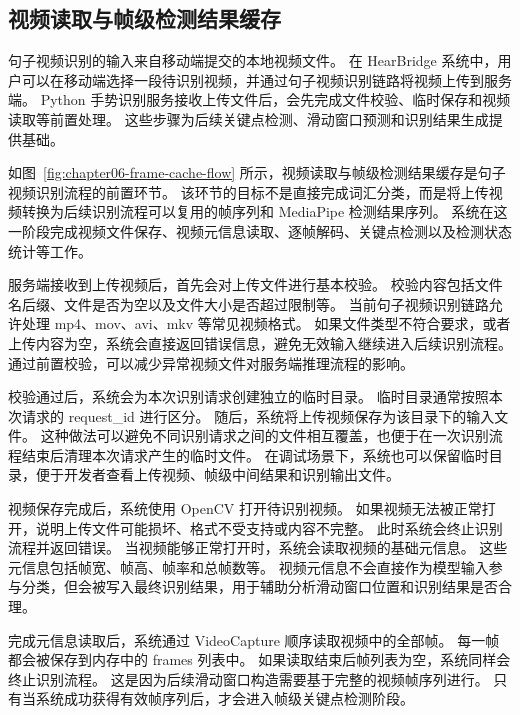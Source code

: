 
\subsection{视频读取与帧级检测结果缓存}

句子视频识别的输入来自移动端提交的本地视频文件。
在 HearBridge 系统中，用户可以在移动端选择一段待识别视频，并通过句子视频识别链路将视频上传到服务端。
Python 手势识别服务接收上传文件后，会先完成文件校验、临时保存和视频读取等前置处理。
这些步骤为后续关键点检测、滑动窗口预测和识别结果生成提供基础。


如图~\ref{fig:chapter06-frame-cache-flow} 所示，视频读取与帧级检测结果缓存是句子视频识别流程的前置环节。
该环节的目标不是直接完成词汇分类，而是将上传视频转换为后续识别流程可以复用的帧序列和 MediaPipe 检测结果序列。
系统在这一阶段完成视频文件保存、视频元信息读取、逐帧解码、关键点检测以及检测状态统计等工作。

服务端接收到上传视频后，首先会对上传文件进行基本校验。
校验内容包括文件名后缀、文件是否为空以及文件大小是否超过限制等。
当前句子视频识别链路允许处理 mp4、mov、avi、mkv 等常见视频格式。
如果文件类型不符合要求，或者上传内容为空，系统会直接返回错误信息，避免无效输入继续进入后续识别流程。
通过前置校验，可以减少异常视频文件对服务端推理流程的影响。

校验通过后，系统会为本次识别请求创建独立的临时目录。
临时目录通常按照本次请求的 request\_id 进行区分。
随后，系统将上传视频保存为该目录下的输入文件。
这种做法可以避免不同识别请求之间的文件相互覆盖，也便于在一次识别流程结束后清理本次请求产生的临时文件。
在调试场景下，系统也可以保留临时目录，便于开发者查看上传视频、帧级中间结果和识别输出文件。

视频保存完成后，系统使用 OpenCV 打开待识别视频。
如果视频无法被正常打开，说明上传文件可能损坏、格式不受支持或内容不完整。
此时系统会终止识别流程并返回错误。
当视频能够正常打开时，系统会读取视频的基础元信息。
这些元信息包括帧宽、帧高、帧率和总帧数等。
视频元信息不会直接作为模型输入参与分类，但会被写入最终识别结果，用于辅助分析滑动窗口位置和识别结果是否合理。

完成元信息读取后，系统通过 VideoCapture 顺序读取视频中的全部帧。
每一帧都会被保存到内存中的 frames 列表中。
如果读取结束后帧列表为空，系统同样会终止识别流程。
这是因为后续滑动窗口构造需要基于完整的视频帧序列进行。
只有当系统成功获得有效帧序列后，才会进入帧级关键点检测阶段。

